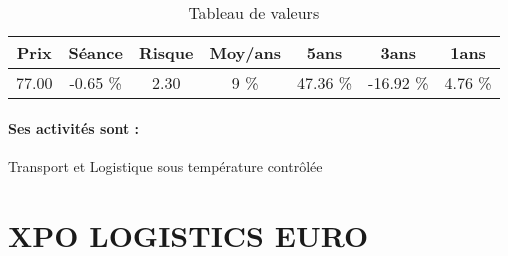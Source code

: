 \documentclass[11pt,a4paper]{report}%
\begin{document}
\begin{table}[H]
  \centering
    \begin{tabular}{|c|c|c|c|c|c|c|}
    \hline
    Prix & Séance & Risque  & Moy/ans & 5ans & 3ans & 1ans \\
    \hline
    77.00 &    -0.65 \%    & 2.30 & 9 \% & 47.36 \% & -16.92 \% & 4.76 \% \\
    \hline
    \end{tabular}%
        \label{tab:table_STEF}%
      \caption{Tableau de valeurs}
\end{table}%

\paragraph{Ses activités sont : } Transport et Logistique sous température contrôlée 
    
    \newpage

\section{XPO LOGISTICS EURO}
\end{document}
